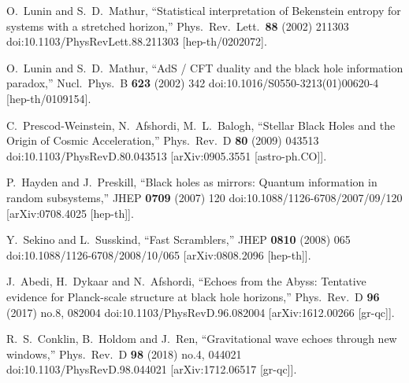 \documentclass[a4paper,11pt]{article}
\begin{document}
\begin{thebibliography}{99}
  O.~Lunin and S.~D.~Mathur,
  ``Statistical interpretation of Bekenstein entropy for systems with a stretched horizon,''
  Phys.\ Rev.\ Lett.\  {\bf 88} (2002) 211303
  doi:10.1103/PhysRevLett.88.211303
  [hep-th/0202072].
  
  O.~Lunin and S.~D.~Mathur,
  ``AdS / CFT duality and the black hole information paradox,''
  Nucl.\ Phys.\ B {\bf 623} (2002) 342
  doi:10.1016/S0550-3213(01)00620-4
  [hep-th/0109154].

  C.~Prescod-Weinstein, N.~Afshordi, M.~L.~Balogh,
  ``Stellar Black Holes and the Origin of Cosmic Acceleration,''
  Phys.\ Rev.\ D {\bf 80} (2009) 043513
  doi:10.1103/PhysRevD.80.043513
  [arXiv:0905.3551 [astro-ph.CO]].

  P.~Hayden and J.~Preskill,
  ``Black holes as mirrors: Quantum information in random subsystems,''
  JHEP {\bf 0709} (2007) 120
  doi:10.1088/1126-6708/2007/09/120
  [arXiv:0708.4025 [hep-th]].

  Y.~Sekino and L.~Susskind,
  ``Fast Scramblers,''
  JHEP {\bf 0810} (2008) 065
  doi:10.1088/1126-6708/2008/10/065
  [arXiv:0808.2096 [hep-th]].

  J.~Abedi, H.~Dykaar and N.~Afshordi,
  ``Echoes from the Abyss: Tentative evidence for Planck-scale structure at black hole horizons,''
  Phys.\ Rev.\ D {\bf 96} (2017) no.8,  082004
  doi:10.1103/PhysRevD.96.082004
  [arXiv:1612.00266 [gr-qc]].
  
  R.~S.~Conklin, B.~Holdom and J.~Ren,
  ``Gravitational wave echoes through new windows,''
  Phys.\ Rev.\ D {\bf 98} (2018) no.4,  044021
  doi:10.1103/PhysRevD.98.044021
  [arXiv:1712.06517 [gr-qc]].
  

\end{thebibliography}
\end{document}
